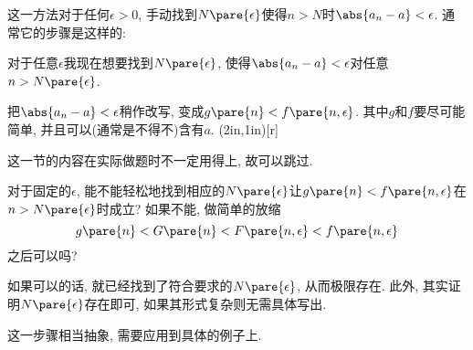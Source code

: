 \documentclass{ctexart}
\begin{document}
这一方法对于任何$\epsilon>0$, 手动找到$N\pare{\epsilon}$使得$n>N$时$\abs{a_n-a}<\epsilon$. 通常它的步骤是这样的:
\begin{cenum}
    \item 对于任意$\epsilon$我现在想要找到$N\pare{\epsilon}$, 使得$\abs{a_n-a} < \epsilon$对任意$n>N\pare{\epsilon}$.
    \item 把$\abs{a_n-a} < \epsilon$稍作改写, 变成$g\pare{n}<f\pare{n, \epsilon}$. 其中$g$和$f$要尽可能简单, 并且可以(通常是不得不)含有$a$.
    \parpic(2in,1in)[r]{\parbox{2in}{\begin{mtips}
        这一节的内容在实际做题时不一定用得上, 故可以跳过.
    \end{mtips}}}
    \item 对于固定的$\epsilon$, 能不能轻松地找到相应的$N\pare{\epsilon}$让$g\pare{n}<f\pare{n, \epsilon}$在$n>N\pare{\epsilon}$时成立? 如果不能, 做简单的放缩
    \[ g\pare{n} < G\pare{n} < F\pare{n,\epsilon} < f\pare{n,\epsilon} \]
    之后可以吗?
    \item 如果可以的话, 就已经找到了符合要求的$N\pare{\epsilon}$, 从而极限存在. 此外, 其实证明$N\pare{\epsilon}$存在即可, 如果其形式复杂则无需具体写出.
\end{cenum}
这一步骤相当抽象, 需要应用到具体的例子上.
\end{document}
